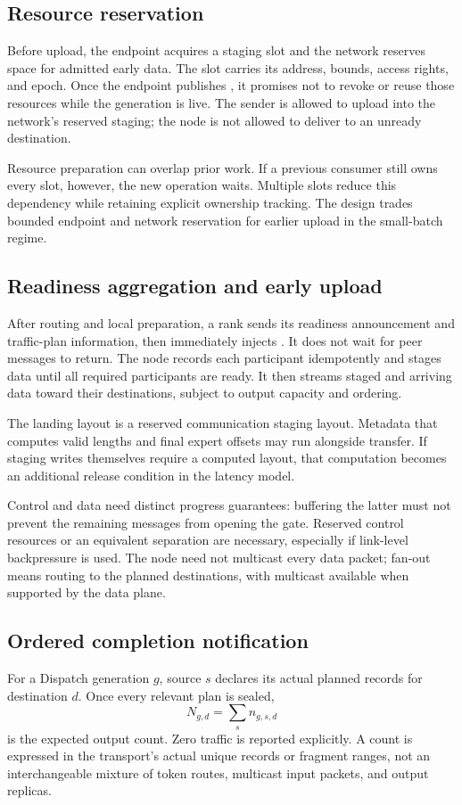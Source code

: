 \subsection{Resource reservation}
Before upload, the endpoint acquires a staging slot and the network reserves space for admitted early data. The slot carries its address, bounds, access rights, and epoch. Once the endpoint publishes \ready{}, it promises not to revoke or reuse those resources while the generation is live. The sender is allowed to upload into the network's reserved staging; the \sys{} node is not allowed to deliver to an unready destination.

Resource preparation can overlap prior work. If a previous consumer still owns every slot, however, the new operation waits. Multiple slots reduce this dependency while retaining explicit ownership tracking. The design trades bounded endpoint and network reservation for earlier upload in the small-batch regime.

\subsection{Readiness aggregation and early upload}
After routing and local preparation, a rank sends its readiness announcement and traffic-plan information, then immediately injects \data{}. It does not wait for peer \ready{} messages to return. The \sys{} node records each participant idempotently and stages data until all required participants are ready. It then streams staged and arriving data toward their destinations, subject to output capacity and ordering.

The landing layout is a reserved communication staging layout. Metadata that computes valid lengths and final expert offsets may run alongside transfer. If staging writes themselves require a computed layout, that computation becomes an additional release condition in the latency model.

Control and data need distinct progress guarantees: buffering the latter must not prevent the remaining \ready{} messages from opening the gate. Reserved control resources or an equivalent separation are necessary, especially if link-level backpressure is used. The node need not multicast every data packet; fan-out means routing to the planned destinations, with multicast available when supported by the data plane.

\subsection{Ordered completion notification}
For a Dispatch generation $g$, source $s$ declares its actual planned records for destination $d$. Once every relevant plan is sealed,
\begin{equation}
 N_{g,d}=\sum_s n_{g,s,d}
 \label{eq:count}
\end{equation}
is the expected output count. Zero traffic is reported explicitly. A count is expressed in the transport's actual unique records or fragment ranges, not an interchangeable mixture of token routes, multicast input packets, and output replicas.


